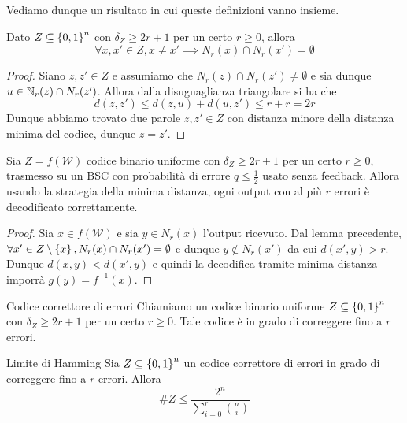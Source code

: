 Vediamo dunque un risultato in cui queste definizioni vanno insieme.

\begin{lemma}{}
  Dato \(Z\subseteq\set{0,1}^n\) con \(\delta_Z \geq 2r+1\) per un certo \(r\geq 0\), allora
  \[\forall x,x' \in Z, x\neq x' \implies N_r(x) \cap N_r(x') = \emptyset\]
\end{lemma}

\begin{proof}
  Siano \(z,z' \in Z\) e assumiamo che \(N_r(z) \cap N_r(z') \neq \emptyset\) e sia dunque \(u \in \mathbb{N}_r(z) \cap N_r(z')\).
  Allora dalla disuguaglianza triangolare si ha che
  \[d(z,z') \leq d(z,u) + d(u,z') \leq r + r = 2r\]
  Dunque abbiamo trovato due parole \(z,z' \in Z\) con distanza minore della distanza minima del codice, dunque \(z=z'\).
\end{proof}

\begin{theorem}{}
  Sia \(Z = f(\mathcal{W})\) codice binario uniforme con \(\delta_Z \geq 2r+1\) per un certo \(r\geq 0\), trasmesso su un BSC con probabilità di errore \(q\leq \frac{1}{2}\) usato senza feedback.
  Allora usando la strategia della minima distanza, ogni output con al più \(r\) errori è decodificato correttamente.
\end{theorem}

\begin{proof}{}
  Sia \(x \in f(\mathcal{W})\) e sia \(y \in N_r(x)\) l'output ricevuto.
  Dal lemma precedente, \(\forall x' \in Z\setminus\set{x}, N_r(x) \cap N_r(x') = \emptyset\) e dunque \(y \not\in N_r(x')\) da cui \(d(x',y) > r\).
  Dunque \(d(x,y) < d(x',y)\) e quindi la decodifica tramite minima distanza imporrà \(g(y) = f^{-1}(x)\).
\end{proof}

\begin{definition}{Codice correttore di errori}
  Chiamiamo  un codice binario uniforme \(Z\subseteq \set{0,1}^n\) con \(\delta_Z \geq 2r+1\) per un certo \(r\geq 0\).
  Tale codice è in grado di correggere fino a \(r\) errori.
\end{definition}

\begin{theorem}{Limite di Hamming}
  Sia \(Z \subseteq \set{0,1}^n\) un codice correttore di errori in grado di correggere fino a \(r\) errori.
  Allora
  \[\#Z \leq \frac{2^n}{\sum_{i=0}^r {n \choose i}}\]
\end{theorem}

